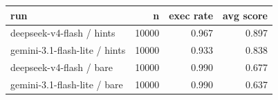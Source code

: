 \begin{tabular}{lrrr}
\toprule
run & n & exec rate & avg score \\
\midrule
deepseek-v4-flash / hints & 10000 & 0.967 & 0.897 \\
gemini-3.1-flash-lite / hints & 10000 & 0.933 & 0.838 \\
deepseek-v4-flash / bare & 10000 & 0.990 & 0.677 \\
gemini-3.1-flash-lite / bare & 10000 & 0.990 & 0.637 \\
\bottomrule
\end{tabular}
